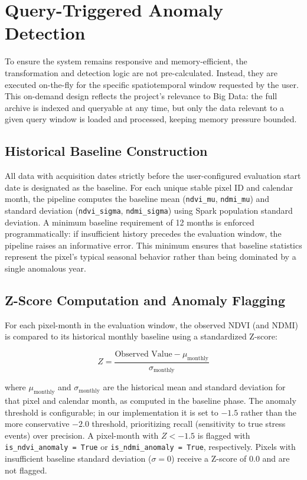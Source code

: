\section{Query-Triggered Anomaly Detection}


To ensure the system remains responsive and memory-efficient, the transformation and detection logic are not pre-calculated. Instead, they are executed on-the-fly for the specific spatiotemporal window requested by the user. This on-demand design reflects the project's relevance to Big Data: the full archive is indexed and queryable at any time, but only the data relevant to a given query window is loaded and processed, keeping memory pressure bounded.

\subsection{Historical Baseline Construction}

All data with acquisition dates strictly before the user-configured evaluation start date is designated as the baseline. For each unique stable pixel ID and calendar month, the pipeline computes the baseline mean (\texttt{ndvi\_mu}, \texttt{ndmi\_mu}) and standard deviation (\texttt{ndvi\_sigma}, \texttt{ndmi\_sigma}) using Spark population standard deviation. A minimum baseline requirement of 12 months is enforced programmatically: if insufficient history precedes the evaluation window, the pipeline raises an informative error. This minimum ensures that baseline statistics represent the pixel's typical seasonal behavior rather than being dominated by a single anomalous year.

\subsection{Z-Score Computation and Anomaly Flagging}
\label{subsec:zscore}

For each pixel-month in the evaluation window, the observed NDVI (and NDMI) is compared to its historical monthly baseline using a standardized Z-score:

\begin{equation}
Z = \frac{\text{Observed Value} - \mu_{\text{monthly}}}{\sigma_{\text{monthly}}}
\end{equation}

where $\mu_{\text{monthly}}$ and $\sigma_{\text{monthly}}$ are the historical mean and standard deviation for that pixel and calendar month, as computed in the baseline phase. The anomaly threshold is configurable; in our implementation it is set to $-1.5$ rather than the more conservative $-2.0$ threshold, prioritizing recall (sensitivity to true stress events) over precision. A pixel-month with $Z < -1.5$ is flagged with \texttt{is\_ndvi\_anomaly = True} or \texttt{is\_ndmi\_anomaly = True}, respectively. Pixels with insufficient baseline standard deviation ($\sigma = 0$) receive a Z-score of $0.0$ and are not flagged. 

